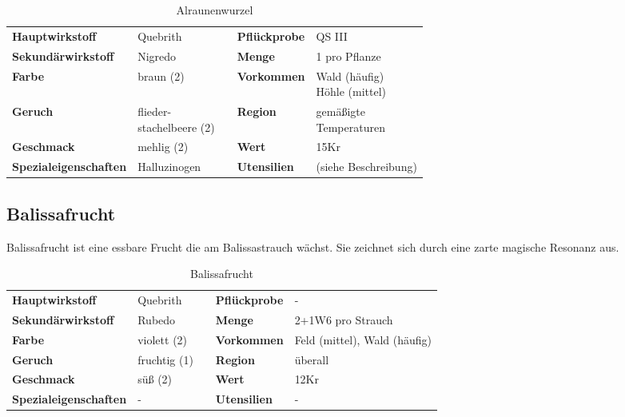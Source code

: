 \begin{table}[h] 
\begin{center} 
\begin{tabular}{|l|l|p{1cm}|l|l|} 
  	\cline{1-2} \cline{4-5} 
  	\textbf{Hauptwirkstoff} & Quebrith && \textbf{Pflückprobe} & QS III \\ \cline{1-2} \cline{4-5} 
  	\textbf{Sekundärwirkstoff} & Nigredo && \textbf{Menge} & 1 pro Pflanze \\ \cline{1-2} \cline{4-5} 
  	\textbf{Farbe} & braun (2) && \textbf{Vorkommen} & \brcell{Wald (häufig) \\ Höhle (mittel)} \\ \cline{1-2} \cline{4-5} 
  	\textbf{Geruch} & \brcell{flieder- \\ stachelbeere (2)} && \textbf{Region} & \brcell{gemäßigte \\ Temperaturen} \\ \cline{1-2} \cline{4-5} 
  	\textbf{Geschmack} & mehlig (2) && \textbf{Wert} & 15Kr \\ \cline{1-2} \cline{4-5} 
  	\textbf{Spezialeigenschaften} & Halluzinogen && \textbf{Utensilien} & (siehe Beschreibung) \\ \cline{1-2} \cline{4-5} 
\end{tabular} 
\end{center} 
\caption{Alraunenwurzel} 
\label{tab:alraunenwurzel} 
\end{table}


\subsection{Balissafrucht}
Balissafrucht ist eine essbare Frucht die am Balissastrauch wächst. Sie zeichnet sich durch eine zarte magische Resonanz aus. 
\newpage
\begin{table}[h]
\begin{center}
\begin{tabular}{|l|l|p{1cm}|l|l|}
	\cline{1-2} \cline{4-5}
	\textbf{Hauptwirkstoff} & Quebrith && \textbf{Pflückprobe} & - \\ \cline{1-2} \cline{4-5}
	\textbf{Sekundärwirkstoff} & Rubedo && \textbf{Menge} & 2+1W6 pro Strauch \\ \cline{1-2} \cline{4-5}
	\textbf{Farbe} & violett (2) && \textbf{Vorkommen} & Feld (mittel), Wald (häufig) \\ \cline{1-2} \cline{4-5}
	\textbf{Geruch} & fruchtig (1) && \textbf{Region} & überall \\ \cline{1-2} \cline{4-5}
	\textbf{Geschmack} & süß (2) && \textbf{Wert} & 12Kr \\ \cline{1-2} \cline{4-5}
	\textbf{Spezialeigenschaften} & - && \textbf{Utensilien} & - \\ \cline{1-2} \cline{4-5}
\end{tabular}
\end{center}
\caption{Balissafrucht}
\label{tab:balissafrucht}
\end{table}


